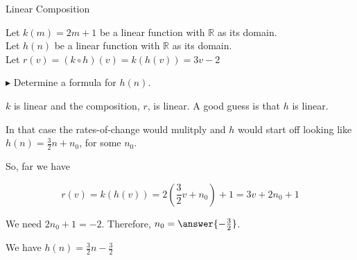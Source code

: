 \documentclass{ximera}
\begin{document}
\begin{example} Linear Composition

Let $k(m) = 2 m + 1$ be a linear function with $\mathbb{R}$ as its domain. \\
Let $h(n)$ be a linear function with $\mathbb{R}$ as its domain. \\


Let $r(v) = (k \circ h)(v) = k(h(v)) = 3 v - 2$ 

$\blacktriangleright$ Determine a formula for $h(n)$.








$k$ is linear and the composition, $r$, is linear. A good guess is that $h$ is linear.  

In that case the rates-of-change would mulitply and $h$ would start off looking like $h(n) = \frac{3}{2} n + n_0$, for some $n_0$.


So, far we have 

\[   r(v) = k(h(v)) = 2 \left(\frac{3}{2} v + n_0\right) + 1  = 3v + 2 n_0 + 1\]


We need $2 n_0 + 1 = -2$.  Therefore, $n_0 = \answer{-\frac{3}{2}}$.


We have $h(n) = \frac{3}{2} n - \frac{3}{2}$

\end{example}
\end{document}
